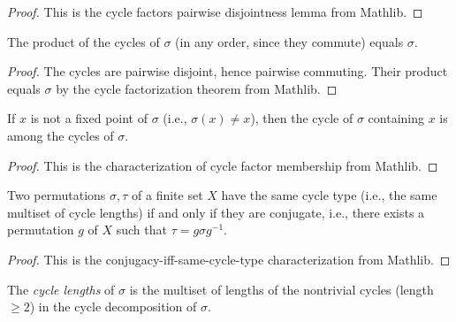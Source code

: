 \begin{proof}
\leanok
This is the cycle factors pairwise disjointness lemma from Mathlib.
\end{proof}

\begin{lemma}
\label{lem.cycles_noncommProd_eq}
\leanhelper
\leanok
The product of the cycles of $\sigma$ (in any order, since they commute) equals $\sigma$.
\end{lemma}

\begin{proof}
\leanok
The cycles are pairwise disjoint, hence pairwise commuting.
Their product equals $\sigma$ by the cycle factorization theorem from Mathlib.
\end{proof}

\begin{lemma}
\label{lem.cycleOf_mem_cycles}
\leanhelper
\leanok
If $x$ is not a fixed point of $\sigma$ (i.e., $\sigma(x) \neq x$),
then the cycle of $\sigma$ containing $x$ is among the cycles of $\sigma$.
\end{lemma}

\begin{proof}
\leanok
This is the characterization of cycle factor membership from Mathlib.
\end{proof}

\begin{lemma}
\label{lem.cycleType_eq_iff_isConj}
\leanhelper
\leanok
Two permutations $\sigma, \tau$ of a finite set $X$ have the same cycle type
(i.e., the same multiset of cycle lengths) if and only if they are conjugate, i.e.,
there exists a permutation $g$ of $X$ such that $\tau = g \sigma g^{-1}$.
\end{lemma}

\begin{proof}
\leanok
This is the conjugacy-iff-same-cycle-type characterization from Mathlib.
\end{proof}

\begin{definition}
\label{def.cycleLengths}
\leanhelper
\leanok
The \emph{cycle lengths} of $\sigma$ is the multiset of lengths
of the nontrivial cycles (length $\geq 2$) in the cycle decomposition of $\sigma$.
\end{definition}

